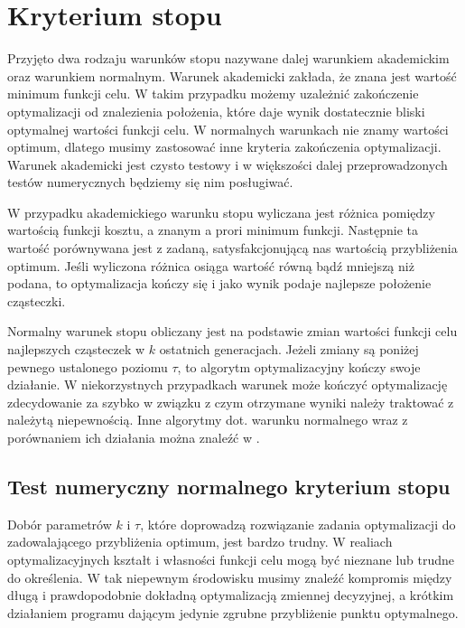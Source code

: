 \documentclass[11pt, a4paper, oneside]{article}
\begin{document}
\section{Kryterium stopu} \label{sec:stop}

Przyjęto dwa rodzaju warunków stopu nazywane dalej warunkiem akademickim oraz warunkiem normalnym. Warunek akademicki zakłada, że znana jest wartość minimum funkcji celu. W takim przypadku możemy uzależnić zakończenie optymalizacji od znalezienia położenia, które daje wynik dostatecznie bliski optymalnej wartości funkcji celu. W normalnych warunkach nie znamy wartości optimum, dlatego musimy zastosować inne kryteria zakończenia optymalizacji. Warunek akademicki jest czysto testowy i w większości dalej przeprowadzonych testów numerycznych będziemy się nim posługiwać.

W przypadku akademickiego warunku stopu wyliczana jest różnica pomiędzy wartością funkcji kosztu, a znanym a prori minimum funkcji. Następnie ta wartość porównywana jest z zadaną, satysfakcjonującą nas wartością przybliżenia optimum. Jeśli wyliczona różnica osiąga wartość równą bądź mniejszą niż podana, to optymalizacja kończy się i jako wynik podaje najlepsze położenie cząsteczki.

Normalny warunek stopu obliczany jest na podstawie zmian wartości funkcji celu najlepszych cząsteczek w $k$ ostatnich generacjach. Jeżeli zmiany są poniżej pewnego ustalonego poziomu $\tau$, to algorytm optymalizacyjny kończy swoje działanie. W niekorzystnych przypadkach warunek może kończyć optymalizację zdecydowanie za szybko w związku z czym otrzymane wyniki należy traktować z należytą niepewnością. Inne algorytmy dot. warunku normalnego wraz z porównaniem ich działania można znaleźć w \cite{karinZielinski}.

\subsection*{Test numeryczny normalnego kryterium stopu}

Dobór parametrów $k$ i $\tau$, które doprowadzą rozwiązanie zadania optymalizacji do zadowalającego przybliżenia optimum, jest bardzo trudny. W realiach optymalizacyjnych kształt i własności funkcji celu mogą być nieznane lub trudne do określenia. W tak niepewnym środowisku musimy znaleźć kompromis między długą i prawdopodobnie dokładną optymalizacją zmiennej decyzyjnej, a krótkim działaniem programu dającym jedynie zgrubne przybliżenie punktu optymalnego.
\end{document}
